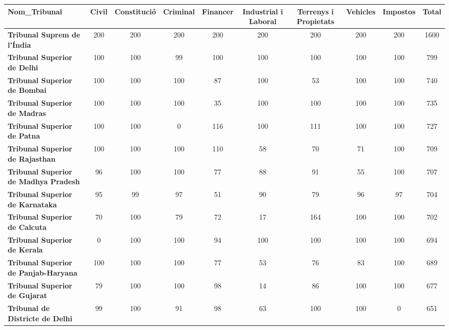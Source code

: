 \begin{table}[H]
  \begin{tabular}{l|cccccccc|c}
    \textbf{Nom\_Tribunal} &
      \textbf{Civil} &
      \textbf{Constitució} &
      \textbf{Criminal} &
      \textbf{Financer} &
      \textbf{Industrial i Laboral} &
      \textbf{Terrenys i Propietats} &
      \textbf{Vehicles} &
      \textbf{Impostos} &
      \textbf{Total} \\
    \hline
    \textbf{Tribunal Suprem de l'Índia}                  & 200  & 200  & 200  & 200  & 200  & 200  & 200  & 200  & 1600 \\
    \textbf{Tribunal Superior de Delhi}                        & 100  & 100  & 99   & 100  & 100  & 100  & 100  & 100  & 799  \\
    \textbf{Tribunal Superior de Bombai}                       & 100  & 100  & 100  & 87   & 100  & 53   & 100  & 100  & 740  \\
    \textbf{Tribunal Superior de Madras}                       & 100  & 100  & 100  & 35   & 100  & 100  & 100  & 100  & 735  \\
    \textbf{Tribunal Superior de Patna}                        & 100  & 100  & 0    & 116  & 100  & 111  & 100  & 100  & 727  \\
    \textbf{Tribunal Superior de Rajasthan}                    & 100  & 100  & 100  & 110  & 58   & 70   & 71   & 100  & 709  \\
    \textbf{Tribunal Superior de Madhya Pradesh}               & 96   & 100  & 100  & 77   & 88   & 91   & 55   & 100  & 707  \\
    \textbf{Tribunal Superior de Karnataka}                    & 95   & 99   & 97   & 51   & 90   & 79   & 96   & 97   & 704  \\
    \textbf{Tribunal Superior de Calcuta}                     & 70   & 100  & 79   & 72   & 17   & 164  & 100  & 100  & 702  \\
    \textbf{Tribunal Superior de Kerala}                       & 0    & 100  & 100  & 94   & 100  & 100  & 100  & 100  & 694  \\
    \textbf{Tribunal Superior de Panjab-Haryana}               & 100  & 100  & 100  & 77   & 53   & 76   & 83   & 100  & 689  \\
    \textbf{Tribunal Superior de Gujarat}                      & 79   & 100  & 100  & 98   & 14   & 86   & 100  & 100  & 677  \\
    \textbf{Tribunal de Districte de Delhi}                    & 99   & 100  & 91   & 98   & 63   & 100  & 100  & 0    & 651  \\

\end{tabular}
\end{table}
